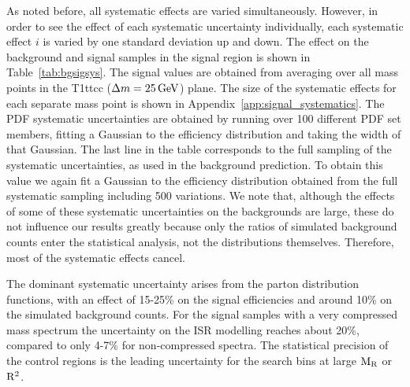 As noted before, all systematic effects are varied simultaneously. However, in order to see the
effect of each systematic uncertainty individually, each systematic effect $i$ is varied by one
standard deviation up and down.  
The effect on the background and signal samples in the signal region is shown in
Table~\ref{tab:bgsigsys}.  
The signal values are obtained from averaging over all mass points in the T1ttcc ($\Delta m =
25\,\text{Ge\hspace{-.08em}V}$) plane.  The size of the systematic effects for each separate mass point is shown in
Appendix~\ref{app:signal_systematics}. 
The PDF systematic uncertainties are obtained by running
over 100 different PDF set members, fitting a Gaussian to the efficiency distribution and taking the
width of that Gaussian.  
The last line in the table corresponds to the full sampling of the systematic uncertainties, as
used in the background prediction. To obtain this value we again fit a Gaussian to the efficiency
distribution obtained from the full systematic sampling including 500 variations.  We note that,
although the effects of some of these systematic uncertainties on the backgrounds are large, these
do not influence our results greatly because only the  ratios of simulated background counts enter
the statistical analysis, not the distributions themselves.  Therefore, most of the systematic
effects cancel. 

The dominant systematic uncertainty arises from the parton distribution functions, with an effect
of 15-25\% on the signal efficiencies and around 10\% on the simulated background counts. For the
signal samples with a very compressed mass spectrum the uncertainty on the ISR modelling reaches
about 20\%, compared to only 4-7\% for non-compressed spectra. 
The statistical precision of the control regions is the leading uncertainty for the search bins at
large $\mathrm{M_R}$ or $\mathrm{R^2}$. 

 

